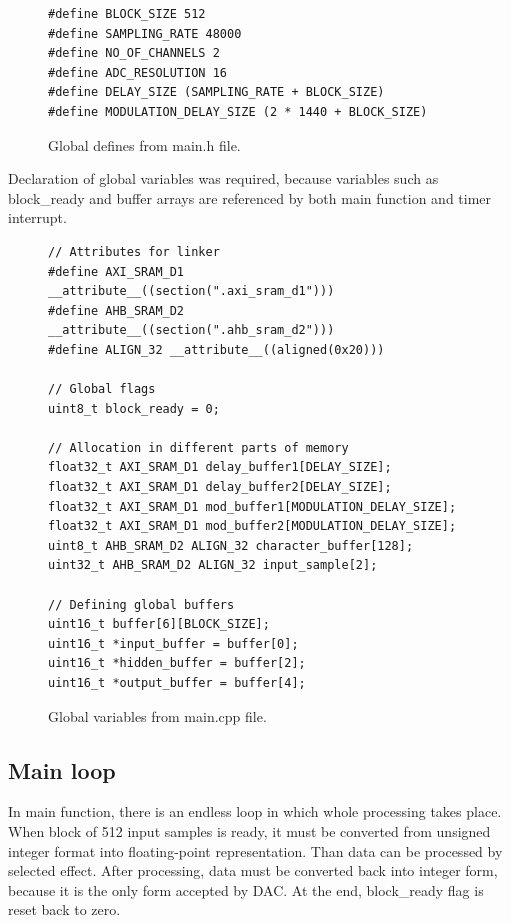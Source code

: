 \documentclass[a4paper,twoside,12pt]{book}
\begin{document}
\begin{figure}[H]
\centering
\begin{lstlisting}
#define BLOCK_SIZE 512
#define SAMPLING_RATE 48000
#define NO_OF_CHANNELS 2
#define ADC_RESOLUTION 16
#define DELAY_SIZE (SAMPLING_RATE + BLOCK_SIZE)
#define MODULATION_DELAY_SIZE (2 * 1440 + BLOCK_SIZE)
\end{lstlisting}
\caption{Global defines from main.h file.}
\label{fig:defs}
\end{figure}

Declaration of global variables was required, because
variables such as block\_ready and buffer arrays are referenced by
both main function and timer interrupt.

\begin{figure}[H]
\centering
\begin{lstlisting}
// Attributes for linker
#define AXI_SRAM_D1 __attribute__((section(".axi_sram_d1")))
#define AHB_SRAM_D2 __attribute__((section(".ahb_sram_d2")))
#define ALIGN_32 __attribute__((aligned(0x20)))

// Global flags
uint8_t block_ready = 0;

// Allocation in different parts of memory
float32_t AXI_SRAM_D1 delay_buffer1[DELAY_SIZE];
float32_t AXI_SRAM_D1 delay_buffer2[DELAY_SIZE];
float32_t AXI_SRAM_D1 mod_buffer1[MODULATION_DELAY_SIZE];
float32_t AXI_SRAM_D1 mod_buffer2[MODULATION_DELAY_SIZE];
uint8_t AHB_SRAM_D2 ALIGN_32 character_buffer[128];
uint32_t AHB_SRAM_D2 ALIGN_32 input_sample[2];

// Defining global buffers
uint16_t buffer[6][BLOCK_SIZE];
uint16_t *input_buffer = buffer[0];
uint16_t *hidden_buffer = buffer[2];
uint16_t *output_buffer = buffer[4];
\end{lstlisting}
\caption{Global variables from main.cpp file.}
\label{fig:vars}
\end{figure}

\subsection{Main loop}
In main function, there is an endless loop in which whole processing takes place.
When block of 512 input samples is ready, it must be converted from unsigned integer
format into floating-point representation.
Than data can be processed by selected effect.
After processing, data must be converted back into integer form, because
it is the only form accepted by DAC.
At the end, block\_ready flag is reset back to zero.
\end{document}
